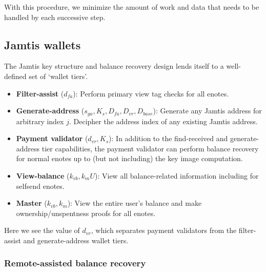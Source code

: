 With this procedure, we minimize the amount of work and data that needs to be handled by each successive step.


\subsection{Jamtis wallets}
\label{subsec:jamtis-wallets}

The Jamtis key structure and balance recovery design lends itself to a well-defined set of `wallet tiers'.

\begin{itemize}
    \item \textbf{Filter-assist} ($d_{fa}$): Perform primary view tag checks for all enotes.

    \item \textbf{Generate-address} ($s_{ga}, K_s, D_{fa}, D_{vr}, D_{base}$): Generate any Jamtis address for arbitrary index $j$. Decipher the address index of any existing Jamtis address.

    \item \textbf{Payment validator} ($d_{vr}, K_s$): In addition to the find-received and generate-address tier capabilities, the payment validator can perform balance recovery for normal enotes up to (but not including) the key image computation.

    \item \textbf{View-balance} ($k_{vb}, k_m U$): View all balance-related information including for selfsend enotes.

    \item \textbf{Master} ($k_{vb}, k_m$): View the entire user's balance and make ownership/unspentness proofs for all enotes.
\end{itemize}

Here we see the value of $d_{vr}$, which separates payment validators from the filter-assist and generate-address wallet tiers.

\subsubsection{Remote-assisted balance recovery}
\label{subsubsec:jamtis-wallets-remote-assisted}

